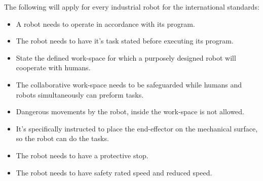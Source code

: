 The following will apply for every industrial robot for the international standards:\cite{Robotterdel1ds}\\
\begin{itemize}
    \item A robot needs to operate in accordance with its program.
    \item The robot needs to have it's task stated before executing its program.
    \item State the defined work-space for which a purposely designed robot will cooperate with humans.
    \item The collaborative work-space needs to be safeguarded while humans and robots simultaneously can preform tasks.
    \item Dangerous movements by the robot, inside the work-space is not allowed.
    \item It's specifically instructed to place the end-effector on the mechanical surface, so the robot can do the tasks.
    \item The robot needs to have a protective stop.
    \item The robot needs to have safety rated speed and reduced speed.
\end{itemize}

